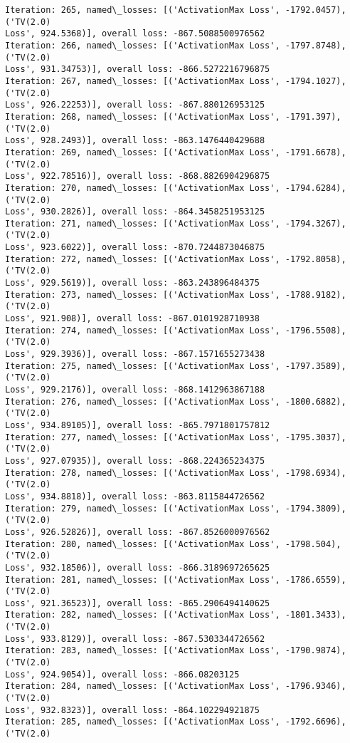 \documentclass[10pt]{article}
\begin{document}
\begin{Verbatim}[commandchars=\\\{\}]
Iteration: 265, named\_losses: [('ActivationMax Loss', -1792.0457), ('TV(2.0)
Loss', 924.5368)], overall loss: -867.5088500976562
Iteration: 266, named\_losses: [('ActivationMax Loss', -1797.8748), ('TV(2.0)
Loss', 931.34753)], overall loss: -866.5272216796875
Iteration: 267, named\_losses: [('ActivationMax Loss', -1794.1027), ('TV(2.0)
Loss', 926.22253)], overall loss: -867.880126953125
Iteration: 268, named\_losses: [('ActivationMax Loss', -1791.397), ('TV(2.0)
Loss', 928.2493)], overall loss: -863.1476440429688
Iteration: 269, named\_losses: [('ActivationMax Loss', -1791.6678), ('TV(2.0)
Loss', 922.78516)], overall loss: -868.8826904296875
Iteration: 270, named\_losses: [('ActivationMax Loss', -1794.6284), ('TV(2.0)
Loss', 930.2826)], overall loss: -864.3458251953125
Iteration: 271, named\_losses: [('ActivationMax Loss', -1794.3267), ('TV(2.0)
Loss', 923.6022)], overall loss: -870.7244873046875
Iteration: 272, named\_losses: [('ActivationMax Loss', -1792.8058), ('TV(2.0)
Loss', 929.5619)], overall loss: -863.243896484375
Iteration: 273, named\_losses: [('ActivationMax Loss', -1788.9182), ('TV(2.0)
Loss', 921.908)], overall loss: -867.0101928710938
Iteration: 274, named\_losses: [('ActivationMax Loss', -1796.5508), ('TV(2.0)
Loss', 929.3936)], overall loss: -867.1571655273438
Iteration: 275, named\_losses: [('ActivationMax Loss', -1797.3589), ('TV(2.0)
Loss', 929.2176)], overall loss: -868.1412963867188
Iteration: 276, named\_losses: [('ActivationMax Loss', -1800.6882), ('TV(2.0)
Loss', 934.89105)], overall loss: -865.7971801757812
Iteration: 277, named\_losses: [('ActivationMax Loss', -1795.3037), ('TV(2.0)
Loss', 927.07935)], overall loss: -868.224365234375
Iteration: 278, named\_losses: [('ActivationMax Loss', -1798.6934), ('TV(2.0)
Loss', 934.8818)], overall loss: -863.8115844726562
Iteration: 279, named\_losses: [('ActivationMax Loss', -1794.3809), ('TV(2.0)
Loss', 926.52826)], overall loss: -867.8526000976562
Iteration: 280, named\_losses: [('ActivationMax Loss', -1798.504), ('TV(2.0)
Loss', 932.18506)], overall loss: -866.3189697265625
Iteration: 281, named\_losses: [('ActivationMax Loss', -1786.6559), ('TV(2.0)
Loss', 921.36523)], overall loss: -865.2906494140625
Iteration: 282, named\_losses: [('ActivationMax Loss', -1801.3433), ('TV(2.0)
Loss', 933.8129)], overall loss: -867.5303344726562
Iteration: 283, named\_losses: [('ActivationMax Loss', -1790.9874), ('TV(2.0)
Loss', 924.9054)], overall loss: -866.08203125
Iteration: 284, named\_losses: [('ActivationMax Loss', -1796.9346), ('TV(2.0)
Loss', 932.8323)], overall loss: -864.102294921875
Iteration: 285, named\_losses: [('ActivationMax Loss', -1792.6696), ('TV(2.0)

\end{Verbatim}
\end{document}
